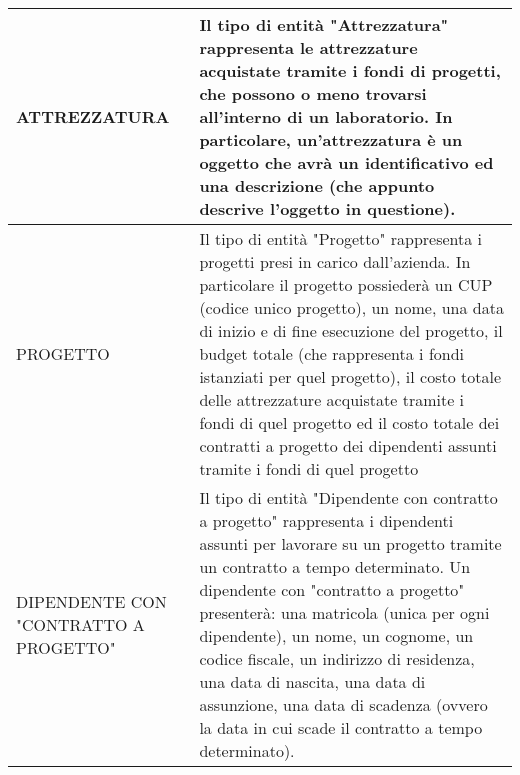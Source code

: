 \begin{tabular}{|C{3cm}|L{11.7cm}|}
            \hline
                ATTREZZATURA &
                Il tipo di entità "Attrezzatura" rappresenta le attrezzature acquistate tramite i fondi di progetti, che possono o meno trovarsi all'interno di un laboratorio. In particolare, un'attrezzatura è un oggetto che avrà un identificativo ed una descrizione (che appunto descrive l'oggetto in questione).\\
            \hline
                PROGETTO &
                Il tipo di entità "Progetto" rappresenta i progetti presi in carico dall'azienda. In particolare il progetto possiederà un CUP (codice unico progetto), un nome, una data di inizio e di fine esecuzione del progetto, il budget totale (che rappresenta i fondi istanziati per quel progetto), il costo totale delle attrezzature acquistate tramite i fondi di quel progetto ed il costo totale dei contratti a progetto dei dipendenti assunti tramite i fondi di quel progetto\\
            \hline
                DIPENDENTE CON "CONTRATTO A PROGETTO" &
                Il tipo di entità "Dipendente con contratto a progetto" rappresenta i dipendenti assunti per lavorare su un progetto tramite un contratto a tempo determinato. Un dipendente con "contratto a progetto" presenterà: una matricola (unica per ogni dipendente), un nome, un cognome, un codice fiscale, un indirizzo di residenza, una data di nascita, una data di assunzione, una data di scadenza (ovvero la data in cui scade il contratto a tempo determinato).\\
            \hline   
        \end{tabular}
        
